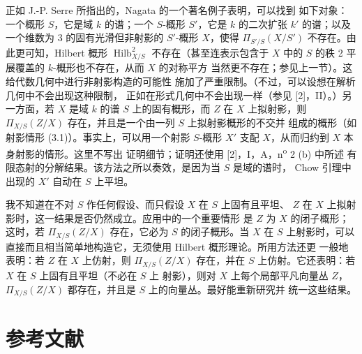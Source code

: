 正如 J.-P. Serre 所指出的，Nagata 的一个著名例子表明，可以找到
如下对象：一个概形 $S$，它是域 $k$ 的谱；一个 $S$-概形 $S'$，它是
$k$ 的二次扩张 $k'$ 的谱；以及一个维数为 3 的固有光滑但非射影的
$S'$-概形 $X$，使得 $\Pi_{S'/S}(X/S')$ 不存在。由此更可知，Hilbert
概形 $\operatorname{Hilb}^2_{X/S}$ 不存在（甚至连表示包含于 $X$
中的 $S$ 的秩 2 平展覆盖的 $k$-概形也不存在，从而 $X$ 的对称平方
当然更不存在；参见上一节）。这给代数几何中进行非射影构造的可能性
施加了严重限制。（不过，可以设想在解析几何中不会出现这种限制，
正如在形式几何中不会出现一样（参见 [2]，II）。）另一方面，若 $X$
是域 $k$ 的谱 $S$ 上的固有概形，而 $Z$ 在 $X$ 上拟射影，则
$\Pi_{X/S}(Z/X)$ 存在，并且是一个由一列 $S$ 上拟射影概形的不交并
组成的概形（如射影情形 (3.1)）。事实上，可以用一个射影
$S$-概形 $X'$ 支配 $X$，从而归约到 $X$ 本身射影的情形。这里不写出
证明细节；证明还使用 [2]，I，A，n\textsuperscript{o} 2 (b) 中所述
有限态射的分解结果。该方法之所以奏效，是因为当 $S$ 是域的谱时，
Chow 引理中出现的 $X'$ 自动在 $S$ 上平坦。

我不知道在不对 $S$ 作任何假设、而只假设 $X$ 在 $S$ 上固有且平坦、
$Z$ 在 $X$ 上拟射影时，这一结果是否仍然成立。应用中的一个重要情形
是 $Z$ 为 $X$ 的闭子概形；这时，若 $\Pi_{X/S}(Z/X)$ 存在，它必为
$S$ 的闭子概形。当 $X$ 在 $S$ 上射影时，可以
直接而且相当简单地构造它，无须使用 Hilbert 概形理论。所用方法还更
一般地表明：若 $Z$ 在 $X$ 上仿射，则 $\Pi_{X/S}(Z/X)$ 存在，并在
$S$ 上仿射。它还表明：若 $X$ 在 $S$ 上固有且平坦（不必在 $S$ 上
射影），则对 $X$ 上每个局部平凡向量丛 $Z$，
$\Pi_{X/S}(Z/X)$ 都存在，并且是 $S$ 上的向量丛。最好能重新研究并
统一这些结果。

\section*{参考文献}

